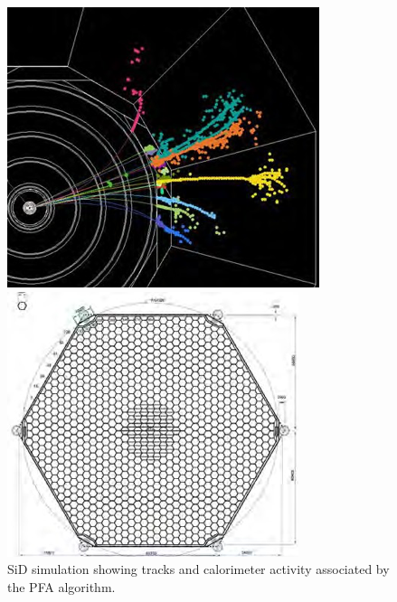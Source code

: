 \begin{figure}
	\centering
	\begin{minipage}[b]{.24\textwidth}
		\includegraphics[width=\linewidth,valign=t]{Calorimeter/SiliconTungstenSiD/showers.png}
		\caption{SiD simulation showing tracks and calorimeter activity associated by the PFA algorithm.}
		\label{fig:Calorimeter:SiDECAL:showers}
	\end{minipage}\hfill
	\begin{minipage}[b]{.34\textwidth}
		\includegraphics[width=\linewidth,valign=t]{Calorimeter/SiliconTungstenSiD/sensor-drawing.png}

\end{minipage}
\end{figure}
